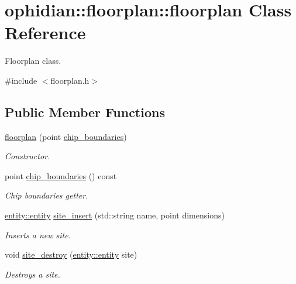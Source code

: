 \hypertarget{classophidian_1_1floorplan_1_1floorplan}{\section{ophidian\-:\-:floorplan\-:\-:floorplan Class Reference}
\label{classophidian_1_1floorplan_1_1floorplan}
}


Floorplan class.  




{\ttfamily \#include $<$floorplan.\-h$>$}

\subsection*{Public Member Functions}
\begin{DoxyCompactItemize}
\item 
\hyperlink{classophidian_1_1floorplan_1_1floorplan_add37c6dba7efa30a5876c86724eb500d}{floorplan} (point \hyperlink{classophidian_1_1floorplan_1_1floorplan_a382fe697a6d6166b0cfb945de1f8ff70}{chip\-\_\-boundaries})
\begin{DoxyCompactList}\small\item\em Constructor. \end{DoxyCompactList}\item 
point \hyperlink{classophidian_1_1floorplan_1_1floorplan_a382fe697a6d6166b0cfb945de1f8ff70}{chip\-\_\-boundaries} () const 
\begin{DoxyCompactList}\small\item\em Chip boundaries getter. \end{DoxyCompactList}\item 
\hyperlink{classophidian_1_1entity_1_1entity}{entity\-::entity} \hyperlink{classophidian_1_1floorplan_1_1floorplan_ab463b231083c84ac04ba4812308d7fb0}{site\-\_\-insert} (std\-::string name, point dimensions)
\begin{DoxyCompactList}\small\item\em Inserts a new site. \end{DoxyCompactList}\item 
void \hyperlink{classophidian_1_1floorplan_1_1floorplan_ad42b426f1cba815bf35d99d6dde69a64}{site\-\_\-destroy} (\hyperlink{classophidian_1_1entity_1_1entity}{entity\-::entity} site)
\begin{DoxyCompactList}\small\item\em Destroys a site. \end{DoxyCompactList}\item 

\end{DoxyCompactItemize}
